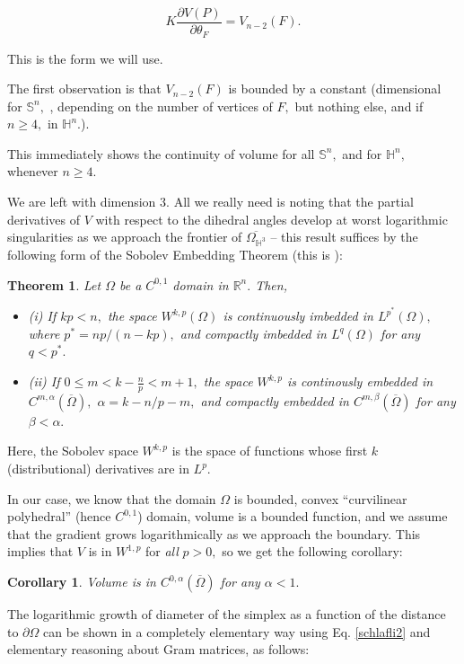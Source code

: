 \documentclass[12pt]{amsart}
\newtheorem{theorem}{Theorem}
\newtheorem{corollary}{Corollary}
\theoremstyle{remark}
\begin{document}
\begin{equation}
\label{schlafli2}
K \dfrac{\partial V(P)}{\partial \theta_F} = V_{n-2}(F).
\end{equation}

This is the form we will use. 

The first observation is that $V_{n-2}(F)$ is bounded by a constant
(dimensional for  $\mathbb{S}^n,$ , depending on the number of vertices of
$F,$ but nothing else, and  if $n \geq 4,$  in $\mathbb{H}^n.$).  

This immediately shows the continuity of volume for all $\mathbb{S}^n,$ and
for $\mathbb{H}^n,$ whenever $n \geq 4.$ 

We are left with dimension $3.$ All we really need is noting that the partial
derivatives of $V$ with respect to the dihedral angles develop at worst
logarithmic singularities as we approach the frontier of
$\overline{\Omega_{\mathbb{H}^3}}$ -- this result suffices by the following
form of the Sobolev Embedding Theorem (this is \cite[Theorem 7.26]{gilbrtru}): 
\begin{theorem}
\label{sobemb}
Let $\Omega$ be a $C^{0,1}$ domain in $\mathbb{R}^n.$ Then,
\begin{itemize}
\item{(i)} If $k p < n,$ the space $W^{k,p}(\Omega)$ is continuously imbedded in $L^{p^*}(\Omega),$ where $p^* = np/(n - kp),$ and compactly imbedded in $L^q(\Omega)$ for any $q < p^*.$
\item{(ii)} If $0 \leq m < k - \frac{n}{p} < m+1,$ the space $W^{k, p}$ is continously embedded in $C^{m, \alpha}(\overline{\Omega}), $ $\alpha=k -n/p - m,$ and compactly embedded in $C^{m, \beta}(\overline{\Omega})$ for any $\beta < \alpha.$
\end{itemize}
\end{theorem}
Here, the Sobolev space $W^{k, p}$ is the space of functions whose first $k$ (distributional) derivatives are in $L^p.$

In our case, we know that the domain $\Omega$ is bounded, convex ``curvilinear polyhedral'' (hence $C^{0, 1}$) domain,  volume is a bounded function, and we assume that the gradient grows logarithmically as we approach the boundary. This implies that $V$ is in $W^{1, p}$ for \emph{all} $p > 0,$ so we get the following corollary:
\begin{corollary}
Volume is in $C^{0, \alpha}(\overline{\Omega})$ for any $\alpha < 1.$
\end{corollary}

The logarithmic growth of diameter of the simplex as a function of the distance to $\partial \Omega$ can be shown in a completely elementary way using Eq. \eqref{schlafli2} and elementary reasoning about Gram matrices, as follows:
\end{document}
